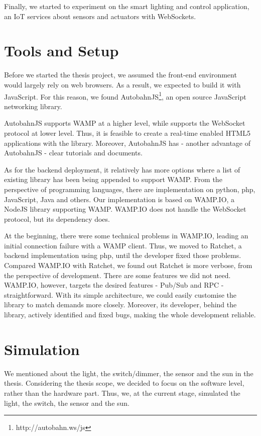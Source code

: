 Finally, we started to experiment on the smart lighting and control application, an IoT services about sensors and actuators with WebSockets. 

\section{Tools and Setup}
Before we started the thesis project, we assumed the front-end environment would largely rely on web browsers. As a result, we expected to build it with JavaScript. For this reason, we found AutobahnJS\footnote{http://autobahn.ws/js}, an open source JavaScript networking library. 

AutobahnJS supports WAMP at a higher level, while supports the WebSocket protocol at lower level. Thus, it is feasible to create a real-time enabled HTML5 applications with the library. Moreover, AutobahnJS has - another advantage of AutobahnJS - clear tutorials and documents.

As for the backend deployment, it relatively has more options where a list of existing library has been being appended to support WAMP. From the perspective of programming languages, there are implementation on python, php, JavaScript, Java and others. Our implementation is based on WAMP.IO, a NodeJS library supporting WAMP. WAMP.IO does not handle the WebSocket protocol, but its dependency does. 

At the beginning, there were some technical problems in WAMP.IO, leading an initial connection failure with a WAMP client. Thus, we moved to Ratchet, a backend implementation using php, until the developer fixed those problems. Compared WAMP.IO with Ratchet, we found out Ratchet is more verbose, from the perspective of development. There are some features we did not need. WAMP.IO, however, targets the desired features - Pub/Sub and RPC - straightforward. With its simple architecture, we could easily customise the library to match demands more closely. Moreover, its developer, behind the library, actively identified and fixed bugs, making the whole development reliable. 

\section{Simulation}
We mentioned about the light, the switch/dimmer, the sensor and the sun in the thesis. Considering the thesis scope, we decided to focus on the software level, rather than the hardware part. Thus, we, at the current stage, simulated the light, the switch, the sensor and the sun. 

